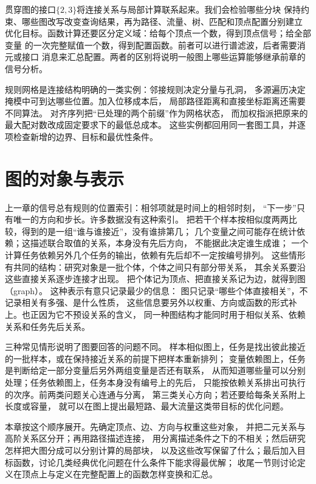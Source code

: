 贯穿图的接口\(\{2,3\}\)将连接关系与局部计算联系起来。我们会检验哪些分块
保持约束、哪些图改写改变查询结果，再为路径、流量、树、匹配和顶点配置分别建立
优化目标。函数计算还要区分定义域：给每个顶点一个数，得到顶点信号；给全部变量
的一次完整赋值一个数，得到配置函数。前者可以进行谱滤波，后者需要消元或接口
消息来汇总配置。两者的区别将说明一般图上哪些运算能够继承前章的信号分析。

规则网格是连接结构明确的一类实例：邻接规则决定分量与孔洞，
多源遍历决定掩模中可到达哪些位置。加入位移成本后，
局部路径距离和直接坐标距离还需要不同算法。
对齐序列把“已处理的两个前缀”作为网格状态，
而加权指派把原来的最大配对数改成固定要求下的最低总成本。
这些实例都回用同一套图工具，并逐项检查新增的边界、目标和最优性条件。

\section{图的对象与表示}
\label{sec:graph-theory-objects-representations}

上一章的信号总有规则的位置索引：相邻项就是时间上的相邻时刻，
“下一步”只有唯一的方向和步长。许多数据没有这种索引。
把若干个样本按相似度两两比较，得到的是一组“谁与谁接近”，没有谁排第几；
几个变量之间可能存在统计依赖；这描述联合取值的关系，本身没有先后方向，
不能据此决定谁生成谁；
一个计算任务依赖另外几个任务的输出，依赖有先后却不一定按编号排列。
这些情形有共同的结构：研究对象是一批个体，个体之间只有部分带关系，
其余关系要沿这些直接关系逐步连接才出现。
把个体记为顶点、把直接关系记为边，就得到图（graph）。
这种表示有意只记录最少的信息：
图只记录“哪些个体直接相关”，不记录相关有多强、是什么性质，
这些信息要另外以权重、方向或函数的形式补上。也正因为它不预设关系的含义，
同一种图结构才能同时用于相似关系、依赖关系和任务先后关系。

三种常见情形说明了图要回答的问题不同。
样本相似图上，任务是找出彼此接近的一批样本，或在保持接近关系的前提下把样本重新排列；
变量依赖图上，任务是判断给定一部分变量后另外两组变量是否还有联系，
从而知道哪些量可以分别处理；任务依赖图上，任务本身没有编号上的先后，
只能按依赖关系排出可执行的次序。前两类问题关心连通与分离，
第三类关心方向；若还要给每条关系附上长度或容量，
就可以在图上提出最短路、最大流量这类带目标的优化问题。

本章按这个顺序展开。先确定顶点、边、方向与权重这些对象，
并把二元关系与高阶关系区分开；再用路径描述连接，
用分离描述条件之下的不相关；然后研究怎样把大图分成可以分别计算的局部块，
以及这些改写保留了什么；最后加入目标函数，讨论几类经典优化问题在什么条件下能求得最优解；
收尾一节则讨论定义在顶点上与定义在完整配置上的函数怎样变换和汇总。

